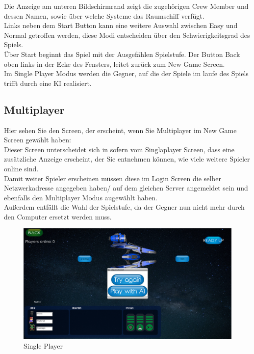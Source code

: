 \documentclass[fontsize=12pt,paper=a4,twoside]{scrartcl}
\begin{document}
Die Anzeige am unteren Bildschirmrand zeigt die zugehörigen Crew Member und dessen Namen, sowie über welche Systeme das Raumschiff verfügt.\\
Links neben dem Start Button kann eine weitere Auswahl zwischen Easy und Normal getroffen werden, diese Modi entscheiden über den Schwierigkeitsgrad des Spiels.\\
Über Start beginnt das Spiel mit der Ausgefählen Spielstufe.
Der Button Back oben links in der Ecke des Fensters, leitet zurück zum New Game Screen.\\
Im Single Player Modus werden die Gegner, auf die der Spiele im laufe des Spiels trifft durch eine KI realisiert.

\newpage
\subsection{Multiplayer}

Hier sehen Sie den Screen, der erscheint, wenn Sie  Multiplayer im New Game Screen gewählt haben:\\
Dieser Screen unterscheidet sich in sofern vom Singlaplayer Screen, dass eine zusätzliche Anzeige erscheint, der Sie entnehmen können, wie viele weitere Spieler online sind.\\
Damit weiter Spieler erscheinen müssen diese im Login Screen die selber Netzwerkadresse angegeben haben/ auf dem gleichen Server angemeldet sein und ebenfalls den Multiplayer Modus augewählt haben.\\
Außerdem entfällt die Wahl der Spielstufe, da der Gegner nun nicht mehr durch den Computer ersetzt werden muss.

\begin{figure}[htp]
	\centering
	\includegraphics[width=1.00\linewidth]{pics/MultiPlayer01.png}
	\caption{Single Player}
	\label{fig1}
\end{figure}
\end{document}
